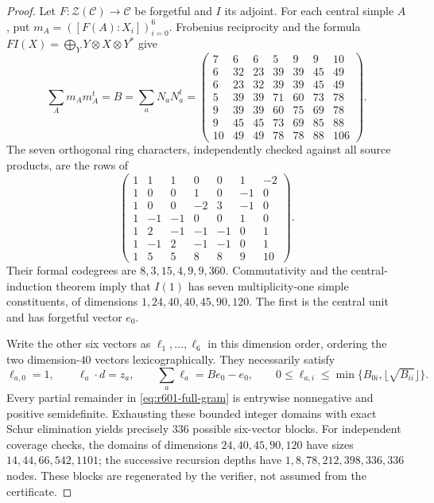 \begin{proof}
Let $F:\mathcal Z(\mathcal C)\to\mathcal C$ be forgetful and
$I$ its adjoint. For each central simple $A$, put
$m_A=([F(A):X_i])_{i=0}^6$. Frobenius reciprocity and the formula
$FI(X)=\bigoplus_Y Y\otimes X\otimes Y^*$ give
\begin{equation}\label{eq:r601-full-gram}
\sum_A m_A m_A^t=B=\sum_a N_aN_a^t
=\begin{pmatrix}
7&6&6&5&9&9&10\\
6&32&23&39&39&45&49\\
6&23&32&39&39&45&49\\
5&39&39&71&60&73&78\\
9&39&39&60&75&69&78\\
9&45&45&73&69&85&88\\
10&49&49&78&78&88&106
\end{pmatrix}.
\end{equation}
The seven orthogonal ring characters, independently checked against
all source products, are the rows of
\[
\begin{pmatrix}
1&1&1&0&0&1&-2\\
1&0&0&1&0&-1&0\\
1&0&0&-2&3&-1&0\\
1&-1&-1&0&0&1&0\\
1&2&-1&-1&-1&0&1\\
1&-1&2&-1&-1&0&1\\
1&5&5&8&8&9&10
\end{pmatrix}.
\]
Their formal codegrees are $8,3,15,4,9,9,360$.
Commutativity and the central-induction theorem
\cite[Theorem~2.13]{OstrikRank3} imply that $I(1)$ has seven
multiplicity-one simple constituents, of dimensions
$1,24,40,40,45,90,120$. The first is the central unit and has
forgetful vector $e_0$.

Write the other six vectors as $\ell_1,\ldots,\ell_6$ in this
dimension order, ordering the two dimension-$40$ vectors
lexicographically. They necessarily satisfy
\[
\ell_{a,0}=1,\qquad \ell_a\cdot d=z_a,\qquad
\sum_a\ell_a=Be_0-e_0,\qquad
0\le\ell_{a,i}\le
\min\{B_{0i},\lfloor\sqrt{B_{ii}}\rfloor\}.
\]
Every partial remainder in \eqref{eq:r601-full-gram} is entrywise
nonnegative and positive semidefinite. Exhausting these bounded integer
domains with exact Schur elimination yields precisely $336$ possible
six-vector blocks. For independent coverage checks, the domains of
dimensions $24,40,45,90,120$ have sizes $14,44,66,542,1101$;
the successive recursion depths have $1,8,78,212,398,336,336$ nodes.
These blocks are regenerated by the verifier, not assumed from the
certificate.


\end{proof}

